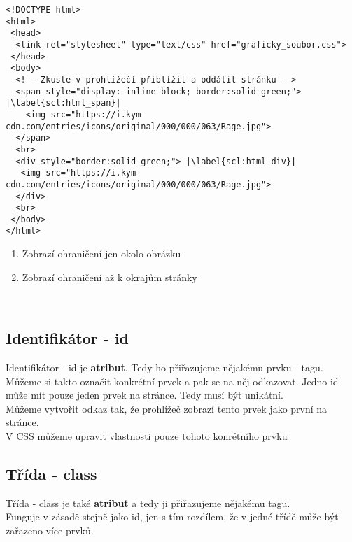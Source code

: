\begin{minipage}[t]{.45\textwidth}
\begin{code}
\begin{verbatim}
<!DOCTYPE html> 
<html> 
 <head> 
  <link rel="stylesheet" type="text/css" href="graficky_soubor.css"> 
 </head> 
 <body> 
  <!-- Zkuste v prohlížečí přiblížit a oddálit stránku -->
  <span style="display: inline-block; border:solid green;"> |\label{scl:html_span}|
    <img src="https://i.kym-cdn.com/entries/icons/original/000/000/063/Rage.jpg">
  </span>
  <br>
  <div style="border:solid green;"> |\label{scl:html_div}|
   <img src="https://i.kym-cdn.com/entries/icons/original/000/000/063/Rage.jpg">
  </div>
  <br>
 </body>
</html>
\end{verbatim}

\label{code:html_odkaz}
\end{code}
\end{minipage}
\begin{minipage}[t]{.45\textwidth}
\begin{enumerate}
\vspace{-0.4cm}
\item[ř. \ref{scl:html_span}:] Zobrazí ohraničení jen okolo obrázku
\item[ř. \ref{scl:html_div}:] Zobrazí ohraničení až k okrajům stránky
\end{enumerate}
\end{minipage}\\

\subsection{Identifikátor - id}
Identifikátor - id je \textbf{atribut}. Tedy ho přiřazujeme nějakému prvku - tagu.\\
Můžeme si takto označit konkrétní prvek a pak se na něj odkazovat. Jedno id může mít pouze jeden prvek na stránce. Tedy musí být unikátní.\\
Můžeme vytvořit odkaz tak, že prohlížeč zobrazí tento prvek jako první na stránce.\\
V CSS můžeme upravit vlastnosti pouze tohoto konrétního prvku

\subsection{Třída - class}
Třída - class je také \textbf{atribut} a tedy ji přiřazujeme nějakému tagu.\\
Funguje v zásadě stejně jako id, jen s tím rozdílem, že v jedné třídě může být zařazeno více prvků.\\

